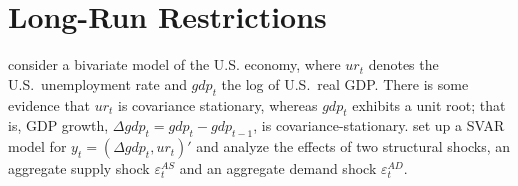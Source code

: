 \section[Long-Run Restrictions]{Long-Run Restrictions\label{ex:BlanchardQuahLongRunRestrictions}}
\textcite{Blanchard.Quah_1989_DynamicEffectsAggregate} consider a bivariate model of the U.S. economy,
  where \(ur_t\) denotes the U.S.\ unemployment rate and \(gdp_t\) the log of U.S.\ real GDP\@.
There is some evidence that \(ur_t\) is covariance stationary,
  whereas \(gdp_t\) exhibits a unit root;
  that is, GDP growth, \(\Delta gdp_t = gdp_{t} - gdp_{t-1}\), is covariance-stationary.
\textcite{Blanchard.Quah_1989_DynamicEffectsAggregate} set up a SVAR model for \(y_t = (\Delta gdp_t, ur_t)'\)
  and analyze the effects of two structural shocks, an aggregate supply shock \(\varepsilon_t^{AS}\) and an aggregate demand shock \(\varepsilon_t^{AD}\).

